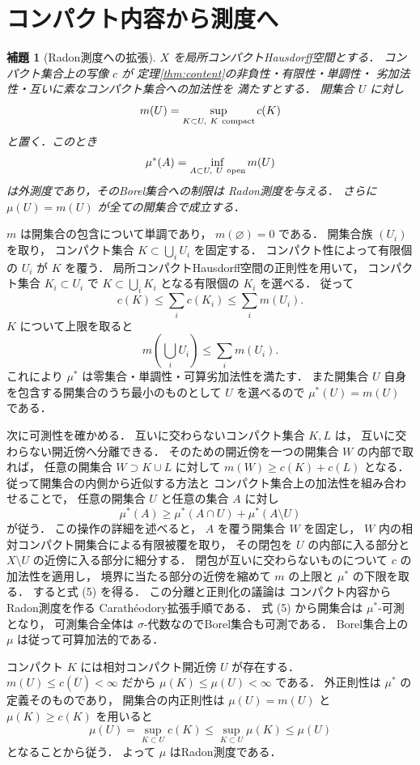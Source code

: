 \documentclass[a5paper,10pt,onecolumn]{jsarticle}
\makeatletter
\theoremstyle{mathnotetheorem}
\newtheorem{lemma}[theorem]{補題}
\renewcommand{\proofname}{証明}
\renewenvironment{proof}[1][\proofname]{%
  \par\pushQED{\qed}\normalfont\topsep4\p@\@plus2\p@\relax
  \trivlist\item[\hskip\labelsep\bfseries #1]\ignorespaces
}{\popQED\endtrivlist\@endpefalse}
\makeatother
\begin{document}
\section{コンパクト内容から測度へ}

\begin{lemma}[Radon測度への拡張]\label{lem:content-extension}
$X$ を局所コンパクトHausdorff空間とする．
コンパクト集合上の写像 $c$ が
定理\ref{thm:content}の非負性・有限性・単調性・
劣加法性・互いに素なコンパクト集合への加法性を
満たすとする．
開集合 $U$ に対し
\[
 m(U)=\sup_{K\subset U,\ K\ {\rm compact}}c(K)
\]
と置く．このとき
\[
 \mu^*(A)=\inf_{A\subset U,\ U\ {\rm open}}m(U)
\]
は外測度であり，そのBorel集合への制限は
Radon測度を与える．
さらに $\mu(U)=m(U)$ が全ての開集合で成立する．
\end{lemma}
\begin{proof}
$m$ は開集合の包含について単調であり，
$m(\varnothing)=0$ である．
開集合族 $(U_i)$ を取り，
コンパクト集合 $K\subset\bigcup_iU_i$ を固定する．
コンパクト性によって有限個の $U_i$ が $K$ を覆う．
局所コンパクトHausdorff空間の正則性を用いて，
コンパクト集合 $K_i\subset U_i$ で
$K\subset\bigcup_iK_i$ となる有限個の $K_i$ を選べる．
従って
\[
 c(K)\le\sum_i c(K_i)\le\sum_i m(U_i).
\]
$K$ について上限を取ると
\[
 m\!\left(\bigcup_iU_i\right)\le\sum_i m(U_i).
 \tag{4}
\]
これにより $\mu^*$ は零集合・単調性・可算劣加法性を満たす．
また開集合 $U$ 自身を包含する開集合のうち最小のものとして
$U$ を選べるので $\mu^*(U)=m(U)$ である．

次に可測性を確かめる．
互いに交わらないコンパクト集合 $K,L$ は，
互いに交わらない開近傍へ分離できる．
そのための開近傍を一つの開集合 $W$ の内部で取れば，
任意の開集合 $W\supset K\cup L$ に対して
$m(W)\ge c(K)+c(L)$ となる．
従って開集合の内側から近似する方法と
コンパクト集合上の加法性を組み合わせることで，
任意の開集合 $U$ と任意の集合 $A$ に対し
\[
 \mu^*(A)\ge\mu^*(A\cap U)+\mu^*(A\setminus U)
 \tag{5}
\]
が従う．
この操作の詳細を述べると，
$A$ を覆う開集合 $W$ を固定し，
$W$ 内の相対コンパクト開集合による有限被覆を取り，
その閉包を $U$ の内部に入る部分と
$X\setminus U$ の近傍に入る部分に細分する．
閉包が互いに交わらないものについて
$c$ の加法性を適用し，
境界に当たる部分の近傍を縮めて
$m$ の上限と $\mu^*$ の下限を取る．
すると式 (5) を得る．
この分離と正則化の議論は
コンパクト内容からRadon測度を作る
Carath\'eodory拡張手順である．
式 (5) から開集合は $\mu^*$-可測となり，
可測集合全体は $\sigma$-代数なのでBorel集合も可測である．
Borel集合上の $\mu$ は従って可算加法的である．

コンパクト $K$ には相対コンパクト開近傍 $U$ が存在する．
$m(U)\le c(\overline U)<\infty$ だから
$\mu(K)\le\mu(U)<\infty$ である．
外正則性は $\mu^*$ の定義そのものであり，
開集合の内正則性は $\mu(U)=m(U)$ と
$\mu(K)\ge c(K)$ を用いると
\[
 \mu(U)=\sup_{K\subset U}c(K)
 \le\sup_{K\subset U}\mu(K)
 \le\mu(U)
\]
となることから従う．
よって $\mu$ はRadon測度である．
\end{proof}
\end{document}
